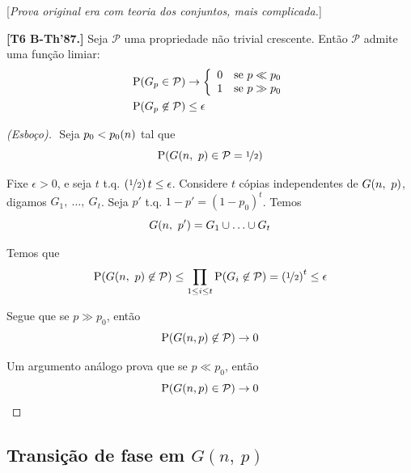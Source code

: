 {[\textit{Prova original era com teoria dos conjuntos, mais complicada.}]

\begin{teorema}
  \normalfont\textbf{[T6 B-Th'87.]}
  Seja $\mathcal{P}$ uma propriedade não trivial crescente. Então $\mathcal{P}$ admite uma função limiar:
  \vspace*{-\baselineskip}
  \begin{align*}
    \P\l(G_p\in\mathcal{P}\r)
      &\rightarrow \l\{\begin{array}{ll}
                      0 & \text{se } p \ll p_0  \\
                      1 & \text{se } p \gg p_0  \\
                    \end{array}\r.                                                                  \\
    \P\l(G_p\not\in\mathcal{P}\r)
      &\leq\epsilon
  \end{align*}
\end{teorema}

\begin{proof}[(Esboço)]$ $\newline
  Seja $p_0<p_0\l(n\r)$ tal que
  \vspace*{-\baselineskip}
  \[
    \P\l(G\l(n,\ p\r)\in\mathcal{P} = \nf{1}{2}\r)
  \]

  Fixe $\epsilon>0$, e seja $t$ t.q. $\l(\nf{1}{2}\r)t\leq\epsilon$. Considere $t$ cópias independentes de $G\l(n,\ p\r)$, digamos $G_1,\ \ldots,\ G_t$. Seja $p'$ t.q. $1-p'=(1-p_0)^t$. Temos
  \[
    G\l(n,\ p'\r) = G_1\cup\ldots\cup G_t
  \]

  Temos que
  \vspace*{-\baselineskip}
  \[
    \P\l(G\l(n,\ p\r)\not\in\mathcal{P}\r)
      \leq \prod_{1\leq i\leq t} \P\l(G_i\not\in\mathcal{P}\r)
      = \l(\nf{1}{2}\r)^t
      \leq \epsilon
  \]

  Segue que se $p\gg p_0$, então
  \[
    \P\l(G\l(n, p\r)\not\in\mathcal{P}\r) \rightarrow 0
  \]

  Um argumento análogo prova que se $p\ll p_0$, então
  \[
    \P\l(G\l(n, p\r)\in\mathcal{P}\r) \rightarrow 0
  \]
\end{proof}

\clearpage
\subsection{Transição de fase em $G(n,\ p)$}$ $\newline

}
